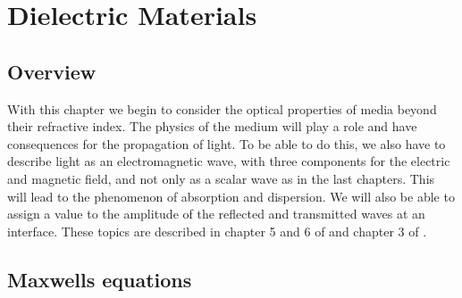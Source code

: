 \renewcommand{\lastmod}{November 24, 2023}
\renewcommand{\chapterauthors}{Markus Lippitz}

\chapter{Dielectric Materials}
\label{chap:dielectrics}




\section{Overview}

With this chapter we begin to consider the optical properties of media beyond their refractive index. The physics of the medium will play a role and have consequences for the propagation of light. To be able to do this, we also have to describe light as an electromagnetic wave, with three components for the electric and magnetic field, and not only as a scalar wave as in the last chapters. This will lead to the phenomenon of absorption and dispersion. We will also be able to assign a value to the amplitude of the reflected and transmitted waves at an interface.  These topics are described in chapter 5 and 6 of \cite{SalehTeich1991} and chapter 3 of \cite{Hecht_Optics}.


\section{Maxwells equations}

